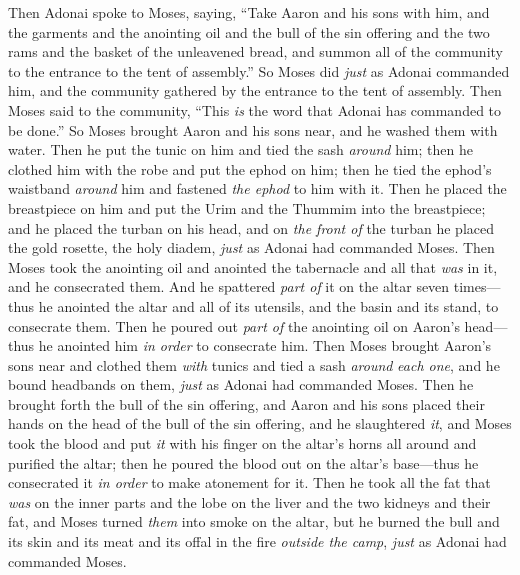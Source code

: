 \begin{biblechapter} %
 Then Adonai spoke to Moses, saying,
\verse “Take Aaron and his sons with him, and the garments and the anointing oil and the bull of the sin offering and the two rams and the basket of the unleavened bread,
\verse and summon all of the community to the entrance to the tent of assembly.”
\verse So Moses did \textit{just} as Adonai commanded him, and the community gathered by the entrance to the tent of assembly.
\verse Then Moses said to the community, “This \textit{is} the word that Adonai has commanded to be done.”
\verse So Moses brought Aaron and his sons near, and he washed them with water.
\verse Then he put the tunic on him and tied the sash \textit{around} him; then he clothed him with the robe and put the ephod on him; then he tied the ephod’s waistband \textit{around} him and fastened \textit{the ephod} to him with it.
\verse Then he placed the breastpiece on him and put the Urim and the Thummim into the breastpiece;
\verse and he placed the turban on his head, and on \textit{the front of} the turban he placed the gold rosette, the holy diadem, \textit{just} as Adonai had commanded Moses.
\verse Then Moses took the anointing oil and anointed the tabernacle and all that \textit{was} in it, and he consecrated them.
\verse And he spattered \textit{part of} it on the altar seven times—thus he anointed the altar and all of its utensils, and the basin and its stand, to consecrate them.
\verse Then he poured out \textit{part of} the anointing oil on Aaron’s head—thus he anointed him \textit{in order} to consecrate him.
\verse Then Moses brought Aaron’s sons near and clothed them \textit{with} tunics and tied a sash \textit{around} \textit{each one}, and he bound headbands on them, \textit{just} as Adonai had commanded Moses.
 Then he brought forth the bull of the sin offering, and Aaron and his sons placed their hands on the head of the bull of the sin offering,
\verse and he slaughtered \textit{it}, and Moses took the blood and put \textit{it} with his finger on the altar’s horns all around and purified the altar; then he poured the blood out on the altar’s base—thus he consecrated it \textit{in order} to make atonement for it.
\verse Then he took all the fat that \textit{was} on the inner parts and the lobe on the liver and the two kidneys and their fat, and Moses turned \textit{them} into smoke on the altar,
\verse but he burned the bull and its skin and its meat and its offal in the fire \textit{outside the camp}, \textit{just} as Adonai had commanded Moses.

\end{biblechapter}
